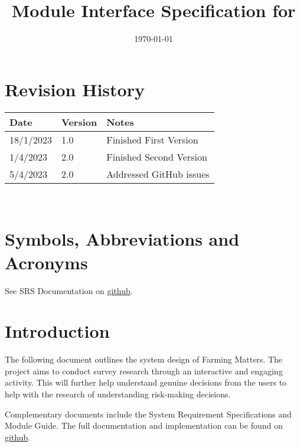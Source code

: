 \documentclass[12pt, titlepage]{article}
\begin{document}
\title{Module Interface Specification for \progname{}}

\author{\authname}

\date{\today}

\maketitle


\section{Revision History}

\begin{tabularx}{\textwidth}{p{3cm}p{2cm}X}
\toprule {\bf Date} & {\bf Version} & {\bf Notes}\\
\midrule
18/1/2023 & 1.0 & Finished First Version\\
1/4/2023 & 2.0 & Finished Second Version\\
5/4/2023 & 2.0 & Addressed GitHub issues\\
\bottomrule
\end{tabularx}

~\newpage

\section{Symbols, Abbreviations and Acronyms}

See SRS Documentation on \href{https://github.com/brandonduong/Farming-Matters/blob/main/docs/SRS/SRS.pdf}{github}.

\newpage

\tableofcontents

\newpage


\section{Introduction}

The following document outlines the system design of Farming Matters. The project aims to conduct survey research through an interactive and engaging activity. This will further help understand genuine decisions from the users to help with the research of understanding risk-making decisions. 

Complementary documents include the System Requirement Specifications
and Module Guide.  The full documentation and implementation can be 
found on \href{https://github.com/brandonduong/Farming-Matters}{github}.
\end{document}
